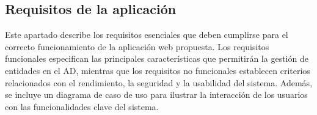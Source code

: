 \subsection{Requisitos de la aplicación}

Este apartado describe los requisitos esenciales que deben cumplirse para el correcto funcionamiento de la aplicación web propuesta. Los requisitos funcionales especifican las principales características que permitirán la gestión de entidades en el AD, mientras que los requisitos no funcionales establecen criterios relacionados con el rendimiento, la seguridad y la usabilidad del sistema. Además, se incluye un diagrama de caso de uso para ilustrar la interacción de los usuarios con las funcionalidades clave del sistema.




